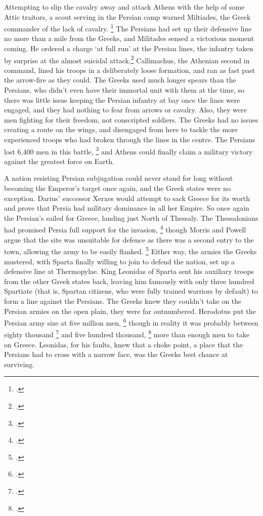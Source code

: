 \documentclass[twoside, a4paper, 12pt]{article}
\begin{document}
Attempting to slip the cavalry away and attack Athens with the help of some
Attic traitors, a scout serving in the Persian camp warned Miltiades, the Greek
commander of the lack of cavalry.
\footcite[35]{green_darius_west}
The Persians had set up their defensive line
no more than a mile from the Greeks, and Militades sensed a victorious moment
coming. He ordered a charge `at full run' at the Persian lines, the infantry
taken by surprise at the almost suicidal attack.\footcite[Book 6.112]{herodotus_1920}
Callimachus, the Athenian second in command, lined his troops in a
deliberately loose formation, and ran as fast past the arrow-fire as they could.
The Greeks used much longer spears than the Persians, who didn't even have their
immortal unit with them at the time, so there was little issue keeping the
Persian infantry at bay once the lines were engaged, and they had nothing to
fear from arrows or cavalry. Also, they were men fighting for their freedom,
not conscripted soldiers. The Greeks had no issues creating a route on the wings,
and disengaged from here to tackle the more experienced troops who had broken
through the lines in the centre. The Persians lost 6,400 men in this battle,
\footcite[37]{green_darius_west} and
Athens could finally claim a military victory against the greatest force on Earth.


\par\vspace{1em}

A nation resisting Persian subjugation could never stand for long without
becoming the Emperor's target once again, and the Greek states were no
exception. Darius' successor Xerxes would attempt to sack Greece for its worth
and prove that Persia had military dominance in all her Empire. So once again
the Persian's sailed for Greece, landing just North of Thessaly. The Thessalonians
had promised Persia full support for the invasion, \footcite[52]{green_legacy_marathon}
though Morris and Powell argue that the site was unsuitable for defence
as there was a second entry to the town, allowing the army to be easily
flanked. \footcite[260]{morris_powell_2010} Either way, the armies the Greeks
mustered, with Sparta finally willing to join to defend the nation, set up
a defensive line at Thermopylae. King Leonidas of Sparta sent his auxiliary
troops from the other Greek states back, leaving him famously with only
three hundred Spartiate (that is, Spartan citizens, who were fully trained
warriors by default) to form a line against the Persians. The Greeks knew they
couldn't take on the Persian armies on the open plain, they were far outnumbered.
Herodotus put the Persian army size at five million men,
\footcite[Book 7.185-6]{herodotus_1920}
though in reality it was probably between eighty thousand \footcite{kim_grecopersia_2017}
and five hundred thousand, \footcite[285]{morris_powell_2010} more than
enough men to take on Greece. Leonidas, for his faults, knew that a choke point,
a place that the Persians had to cross with a narrow face, was the Greeks best
chance at surviving.
\end{document}
